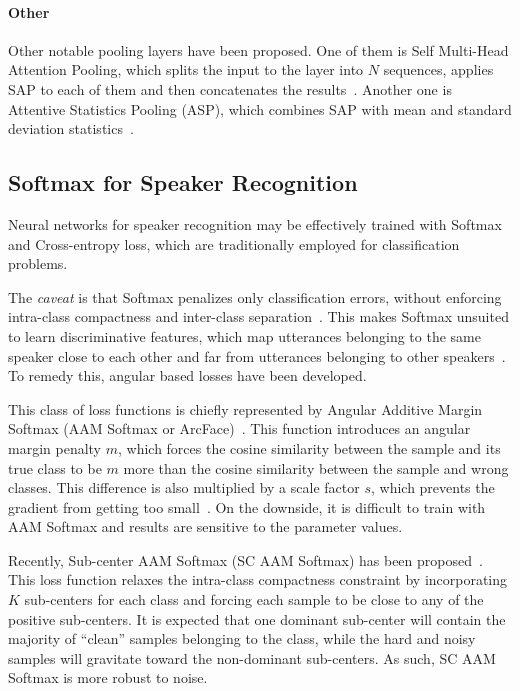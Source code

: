 \documentclass[conference]{IEEEtran}
\begin{document}
\paragraph{Other}Other notable pooling layers have been proposed. One of them is Self Multi-Head Attention Pooling, which splits the input to the layer into $N$ sequences, applies SAP to each of them and then concatenates the results~\cite{india2019selfmha}. Another one is Attentive Statistics Pooling (ASP), which combines SAP with mean and standard deviation statistics~\cite{okabe2018asp}.

\subsection{Softmax for Speaker Recognition}

Neural networks for speaker recognition may be effectively trained with Softmax and Cross-entropy loss, which are traditionally employed for classification problems. 

The \textit{caveat} is that Softmax penalizes only classification errors, without enforcing intra-class compactness and inter-class separation~\cite{chung2020defence}. This makes Softmax unsuited to learn discriminative features, which map utterances belonging to the same speaker close to each other and far from utterances belonging to other speakers~\cite{liu2019large}. To remedy this, angular based losses have been developed.


This class of loss functions is chiefly represented by Angular Additive Margin Softmax (AAM Softmax or ArcFace)~\cite{deng2019arcface}. This function introduces an angular margin penalty $m$, which forces the cosine similarity between the sample and its true class to be $m$ more than the cosine similarity between the sample and wrong classes. This difference is also multiplied by a scale factor $s$, which prevents the gradient from getting too small~\cite{chung2020defence,hajibabaei2018unified}. On the downside, it is difficult to train with AAM Softmax and results are sensitive to the parameter values.

Recently, Sub-center AAM Softmax (SC AAM Softmax) has been proposed~\cite{deng2020subarcface}. This loss function relaxes the intra-class compactness constraint by incorporating $K$ sub-centers for each class and forcing each sample to be close to any of the positive sub-centers. It is expected that one dominant sub-center will contain the majority of ``clean'' samples belonging to the class, while the hard and noisy samples will gravitate toward the non-dominant sub-centers. As such, SC AAM Softmax is more robust to noise.
\end{document}
